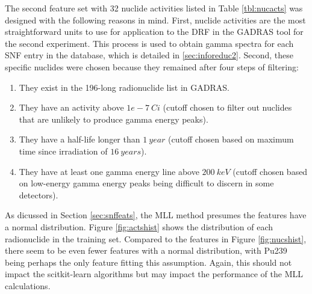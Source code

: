 The second feature set with 32 nuclide activities listed in Table
\ref{tbl:nucacts} was designed with the following reasons in mind. First,
nuclide activities are the most straightforward units to use for application to
the \gls{DRF} in the \gls{GADRAS} tool for the second experiment. This process
is used to obtain gamma spectra for each \gls{SNF} entry in the database, which
is detailed in \ref{sec:inforeduc2}.  Second, these specific nuclides were
chosen because they remained after four steps of filtering:
\begin{enumerate}
  \item They exist in the 196-long radionuclide list in \gls{GADRAS}.
  \item They have an activity above $1e-7\:Ci$ (cutoff chosen to filter out
  nuclides that are unlikely to produce gamma energy peaks).
  \item They have a half-life longer than $1\:year$ (cutoff chosen based on
  maximum time since irradiation of $16\:years$).
  \item They have at least one gamma energy line above $200\:keV$ (cutoff
  chosen based on low-energy gamma energy peaks being difficult to discern in
  some detectors).
\end{enumerate}

As dicussed in Section \ref{sec:snffeats}, the \gls{MLL} method presumes the
features have a normal distribution. Figure \ref{fig:actshist} shows the
distribution of each radionuclide in the training set. Compared to the features
in Figure \ref{fig:nucshist}, there seem to be even fewer features with a
normal distribution, with Pu239 being perhaps the only feature fitting this
assumption. Again, this should not impact the scitkit-learn algorithms but may
impact the performance of the \gls{MLL} calculations.  

